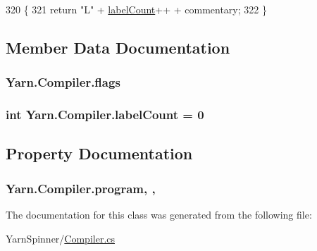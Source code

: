 \begin{DoxyCode}
320                                                        \{
321             \textcolor{keywordflow}{return} \textcolor{stringliteral}{"L"} + \hyperlink{a00043_a87758397eba2e84cda8e0d6c40656f3f}{labelCount}++ + commentary;
322         \}
\end{DoxyCode}


\subsection{Member Data Documentation}
\hypertarget{a00043_a541022d89bcf9bc8f794eb6d6b438d08}{
\subsubsection[{flags}]{ Yarn.\-Compiler.\-flags\hspace{0.3cm}{\ttfamily [private]}}}\label{a00043_a541022d89bcf9bc8f794eb6d6b438d08}
\hypertarget{a00043_a87758397eba2e84cda8e0d6c40656f3f}{
\subsubsection[{label\-Count}]{\setlength{\rightskip}{0pt plus 5cm}int Yarn.\-Compiler.\-label\-Count = 0\hspace{0.3cm}{\ttfamily [private]}}}\label{a00043_a87758397eba2e84cda8e0d6c40656f3f}


\subsection{Property Documentation}
\hypertarget{a00043_aa1737da428ec7d597009661dd8a47829}{
\subsubsection[{program}]{ Yarn.\-Compiler.\-program\hspace{0.3cm}{\ttfamily [get]}, {\ttfamily [set]}, {\ttfamily [package]}}}\label{a00043_aa1737da428ec7d597009661dd8a47829}


The documentation for this class was generated from the following file\-:\begin{DoxyCompactItemize}
\item 
Yarn\-Spinner/\hyperlink{a00137}{Compiler.\-cs}\end{DoxyCompactItemize}
